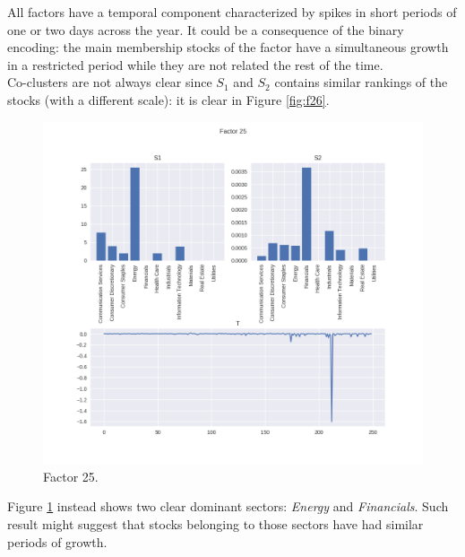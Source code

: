 \documentclass[12pt]{extarticle}
\begin{document}
All factors have a temporal component characterized by spikes in short periods of one or two days across the year. It could be a consequence of the binary encoding: the main membership stocks of the factor have a simultaneous growth in a restricted period while they are not related the rest of the time.\\
Co-clusters are not always clear since $S_1$ and $S_2$ contains similar rankings of the stocks (with a different scale): it is clear in Figure \ref{fig:f26}.

\begin{figure}[!h]
	\centering
	\includegraphics[width=\textwidth]{factor_25.png}
	\caption{Factor 25.} 
	\label{fig:f25}
\end{figure}

Figure \ref{fig:f25} instead shows two clear dominant sectors: \textit{Energy} and \textit{Financials}. Such result might suggest that stocks belonging to those sectors have had similar periods of growth. 
\end{document}

